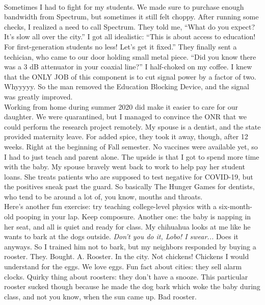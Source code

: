 \documentclass[../../main.tex]{subfiles}
\begin{document}
\\
\vspace{0.25cm}
Sometimes I had to fight for my students.  We made sure to purchase enough bandwidth from Spectrum, but sometimes it still felt choppy.  After running some checks, I realized a need to call Spectrum.  They told me, ``What do you expect?  It's slow all over the city.''  I got all idealistic: ``This is about access to education!  For first-generation students no less!  Let's get it fixed.'' They finally sent a techician, who came to our door holding small metal piece.  ``Did you know there was a 3 dB attenuator in your coaxial line?''  I half-choked on my coffee.  I knew that the ONLY JOB of this component is to cut signal power by a factor of two.  Whyyyyy.  So the man removed the Education Blocking Device, and the signal was greatly improved.
\\
\vspace{0.25cm}
Working from home during summer 2020 did make it easier to care for our daughter.  We were quarantined, but I managed to convince the ONR that we could perform the research project remotely.  My spouse is a dentist, and the state provided maternity leave.  For added spice, they took it away, though, after 12 weeks.  Right at the beginning of Fall semester.  No vaccines were available yet, so I had to just teach and parent alone.  The upside is that I got to spend more time with the baby.  My spouse bravely went back to work to help pay her student loans.  She treats patients who are supposed to test negative for COVID-19, but the positives sneak past the guard.  So basically The Hunger Games for dentists, who tend to be around a lot of, you know, mouths and throats.
\\
\vspace{0.25cm}
Here's another fun exercise: try teaching college-level physics with a six-month-old pooping in your lap.  Keep composure.  Another one: the baby is napping in her seat, and all is quiet and ready for class.  My chihuahua looks at me like he wants to bark at the dogs outside.  \textit{Don't you do it, Lobo!  I swear...} Does it anyways.  So I trained him not to bark, but my neighbors responded by buying a rooster.  They. Bought. A. Rooster.  In the city.  Not chickens!  Chickens I would understand for the eggs.  We love eggs.  Fun fact about cities: they sell alarm clocks.  Quirky thing about roosters: they don't have a snooze.  This particular rooster sucked though because he made the dog bark which woke the baby during class, and not you know, when the sun came up.  Bad rooster.
\end{document}
